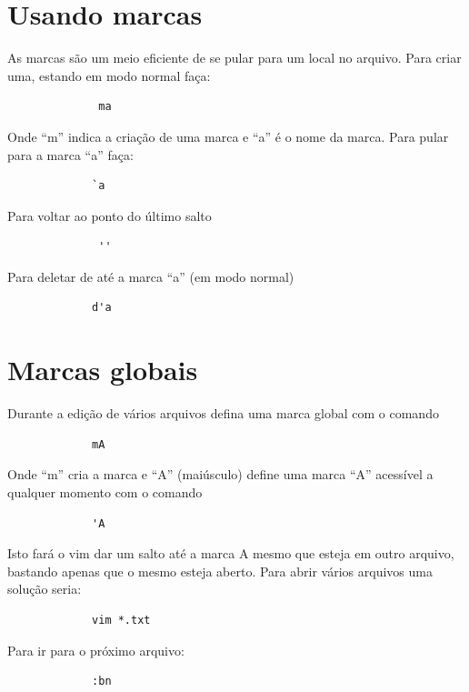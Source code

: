 \documentclass[10pt,a4paper,openany]{book}
\begin{document}
\section{Usando marcas}
\label{sec:Usando marcas}

As marcas são um meio eficiente de se pular para um local no arquivo. Para
criar uma,  estando em modo normal faça:

\begin{verbatim}
			  ma
\end{verbatim}

Onde ``m'' indica a criação de uma marca e ``a'' é o nome da marca. Para pular para a marca ``a'' faça:

\begin{verbatim}
			 `a
\end{verbatim}

Para voltar ao ponto do último salto

\begin{verbatim}
			  ''
\end{verbatim}

Para deletar de até a marca ``a'' (em modo normal)

\begin{verbatim}
			 d'a
\end{verbatim}

\section{Marcas globais}
Durante a edição de vários arquivos defina uma marca global com o comando

\begin{verbatim}
			 mA
\end{verbatim}

Onde ``m'' cria a marca e ``A'' (maiúsculo) define uma marca ``A'' acessível a qualquer momento com o comando

\begin{verbatim}
			 'A
\end{verbatim}

Isto fará o vim dar um salto até a marca A mesmo que esteja em outro
arquivo, bastando apenas que o mesmo esteja aberto. Para abrir vários
arquivos uma solução seria:

\begin{verbatim}
			 vim *.txt
\end{verbatim}

Para ir para o próximo arquivo:

\begin{verbatim}
			 :bn
\end{verbatim}
\end{document}
